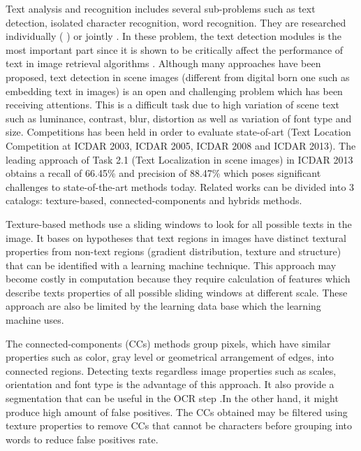 Text analysis and recognition includes several sub-problems such as text detection, isolated character recognition, word recognition. They are researched individually (\cite{Campos.2010.CVPR} \cite{Chen.2004.CVPR} \cite{Liu.2006.CRA} \cite{Epshtein.2010.CVPR} \cite{xucheng.2013.pami}) or jointly \cite{Neumann12}. In these problem, the text detection modules is the most important part since it is shown to be critically affect the performance of text in image retrieval algorithms \cite{Epshtein.2010.CVPR}. Although many approaches have been proposed, text detection in scene images (different from digital born one such as embedding text in images) is an open and challenging problem which has been receiving attentions. This is a difficult task due to high variation of scene text such as luminance, contrast, blur, distortion as well as variation of font type and size. Competitions has been held in order to evaluate state-of-art (Text Location Competition at ICDAR 2003, ICDAR 2005, ICDAR 2008 and ICDAR 2013). The leading approach of Task 2.1 (Text Localization in scene images) in ICDAR 2013 obtains a recall of 66.45\% and precision of 88.47\% \cite{ICDAR.2013} which poses significant challenges to state-of-the-art methods today. Related works can be divided into 3 catalogs: texture-based, connected-components and hybrids methods. 
\par
Texture-based methods \cite{Chen.2004.CVPR} use a sliding windows to look for all possible texts in the image. It bases on hypotheses that text regions in images have distinct textural properties from non-text regions (gradient distribution, texture and structure) that can be identified with a learning machine technique. This approach may become costly in computation because they require calculation of features which describe texts properties of all possible sliding windows at different scale. These approach are also be limited by the learning data base which the learning machine uses. 
\par
The connected-components (CCs) methods \cite{Epshtein.2010.CVPR} \cite{xucheng.2013.pami} group pixels, which have similar properties such as color, gray level or geometrical arrangement of edges, into connected regions. Detecting texts regardless image properties such as scales, orientation and font type is the advantage of this approach. It also provide a segmentation that can be useful in the OCR step .In the other hand, it might produce high amount of false positives. The CCs obtained may be filtered using texture properties to remove CCs that cannot be characters before grouping into words to reduce false positives rate.
